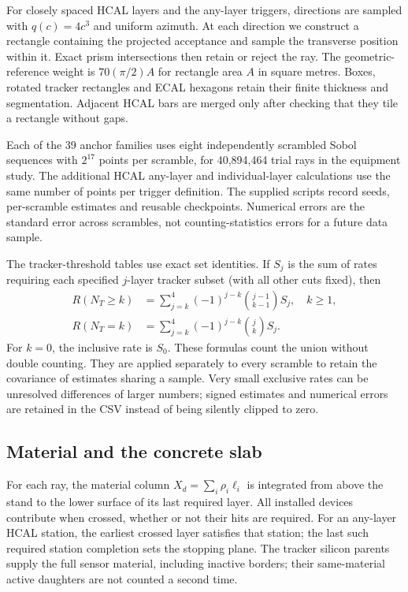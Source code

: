 For closely spaced HCAL layers and the any-layer triggers, directions are
sampled with $q(c)=4c^3$ and uniform azimuth. At each direction we construct
a rectangle containing the projected acceptance and sample the transverse
position within it. Exact prism intersections then retain or reject the ray.
The geometric-reference weight is $70(\pi/2)A$ for rectangle area $A$ in
square metres. Boxes, rotated tracker rectangles and ECAL hexagons retain
their finite thickness and segmentation. Adjacent HCAL bars are merged only
after checking that they tile a rectangle without gaps.

Each of the 39 anchor families uses eight independently scrambled Sobol
sequences with $2^{17}$ points per scramble, for 40,894,464 trial rays in the
equipment study. The additional HCAL any-layer and individual-layer calculations
use the same number of points per trigger definition. The supplied scripts
record seeds, per-scramble estimates and reusable checkpoints. Numerical errors
are the standard error across scrambles, not counting-statistics errors for
a future data sample.

The tracker-threshold tables use exact set identities. If $S_j$ is the sum of
rates requiring each specified $j$-layer tracker subset (with all other cuts
fixed), then
\begin{align}
 R(N_T\ge k)&=\sum_{j=k}^{4}(-1)^{j-k}\binom{j-1}{k-1}S_j,\quad k\ge1,\\
 R(N_T=k)&=\sum_{j=k}^{4}(-1)^{j-k}\binom{j}{k}S_j.
\end{align}
For $k=0$, the inclusive rate is $S_0$. These formulas count the union without
double counting. They are applied separately to every scramble to retain
the covariance of estimates sharing a sample. Very small exclusive rates
can be unresolved differences of larger numbers; signed estimates and numerical
errors are retained in the CSV instead of being silently clipped to zero.

\subsection{Material and the concrete slab}
For each ray, the material column $X_d=\sum_i\rho_i\ell_i$ is integrated from
above the stand to the lower surface of its last required layer. All installed
devices contribute when crossed, whether or not their hits are required.
For an any-layer HCAL station, the earliest crossed layer satisfies that
station; the last such required station completion sets the stopping plane.
The tracker silicon parents supply the full sensor material, including inactive
borders; their same-material active daughters are not counted a second time.

